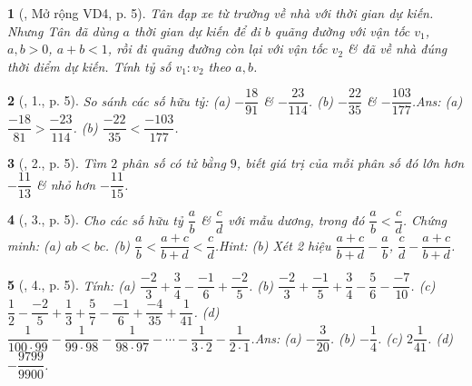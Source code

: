 \documentclass{article}
\newtheorem{baitoan}{}
\begin{document}
\begin{baitoan}[\cite{Binh_Toan_7_tap_1}, Mở rộng VD4, p. 5]
	Tân đạp xe từ trường về nhà với thời gian dự kiến. Nhưng Tân đã dùng $a$ thời gian dự kiến để đi $b$ quãng đường với vận tốc $v_1$, $a,b > 0$, $a + b < 1$, rồi đi quãng đường còn lại với vận tốc $v_2$ \& đã về nhà đúng thời điểm dự kiến. Tính tỷ số $v_1:v_2$ theo $a,b$.
\end{baitoan}

\begin{baitoan}[\cite{Binh_Toan_7_tap_1}, 1., p. 5]
	So sánh các số hữu tỷ: (a) $-\dfrac{18}{91}$ \& $-\dfrac{23}{114}$. (b) $-\dfrac{22}{35}$ \& $-\dfrac{103}{177}$.\hfill{\sf Ans: (a) $\dfrac{-18}{81} > \dfrac{-23}{114}$. (b) $\dfrac{-22}{35} < \dfrac{-103}{177}$.}
\end{baitoan}

\begin{baitoan}[\cite{Binh_Toan_7_tap_1}, 2., p. 5]
	Tìm $2$ phân số có tử bằng $9$, biết giá trị của mỗi phân số đó lớn hơn $-\dfrac{11}{13}$ \& nhỏ hơn $-\dfrac{11}{15}$.
\end{baitoan}

\begin{baitoan}[\cite{Binh_Toan_7_tap_1}, 3., p. 5]
	Cho các số hữu tỷ $\dfrac{a}{b}$ \& $\dfrac{c}{d}$ với mẫu dương, trong đó $\dfrac{a}{b} < \dfrac{c}{d}$. Chứng minh: (a) $ab < bc$. (b) $\dfrac{a}{b} < \dfrac{a + c}{b + d} < \dfrac{c}{d}$.\hfill{\sf Hint: (b) Xét 2 hiệu $\dfrac{a + c}{b + d} - \dfrac{a}{b}$, $\dfrac{c}{d} - \dfrac{a + c}{b + d}$.}
\end{baitoan}

\begin{baitoan}[\cite{Binh_Toan_7_tap_1}, 4., p. 5]
	Tính: (a) $\dfrac{-2}{3} + \dfrac{3}{4} - \dfrac{-1}{6} + \dfrac{-2}{5}$. (b) $\dfrac{-2}{3} + \dfrac{-1}{5} + \dfrac{3}{4} - \dfrac{5}{6} - \dfrac{-7}{10}$. (c) $\dfrac{1}{2} - \dfrac{-2}{5} + \dfrac{1}{3} + \dfrac{5}{7} - \dfrac{-1}{6} + \dfrac{-4}{35} + \dfrac{1}{41}$. (d) $\dfrac{1}{100\cdot 99} - \dfrac{1}{99\cdot 98} - \dfrac{1}{98\cdot 97} - \cdots - \dfrac{1}{3\cdot 2} - \dfrac{1}{2\cdot 1}$.\hfill{\sf Ans: (a) $-\dfrac{3}{20}$. (b) $-\dfrac{1}{4}$. (c) $2\dfrac{1}{41}$. (d) $-\dfrac{9799}{9900}$.}
\end{baitoan}
\end{document}
